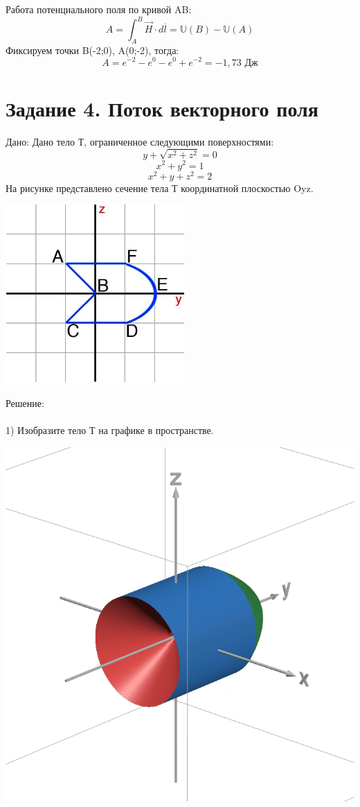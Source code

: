 \documentclass{article}
\begin{document}
Работа потенциального поля по кривой AB:
\begin{equation*}
    A = \int_{A}^{B}\vec{H}\cdot d\overline{l} = \mathbb{U}(B) - \mathbb{U}(A)
\end{equation*}
Фиксируем точки B(-2;0), A(0;-2), тогда:
\begin{equation*}
    A = e^{-2}-e^{0}-e^{0}+e^{-2} = -1,73 \text{ Дж}
\end{equation*}
\section*{Задание 4. Поток векторного поля}
Дано: Дано тело Т, ограниченное следующими поверхностями:
\begin{equation*}
    y+\sqrt{x^2+z^2}=0
\end{equation*}
\begin{equation*}
    x^2+y^2=1
\end{equation*}
\begin{equation*}
    x^2+y+z^2=2
\end{equation*}
На рисунке представлено сечение тела Т координатной плоскостью Oyz.
\begin{center}
    \includegraphics[width=.3\textwidth]{figure.png}
\end{center}
Решение:
\\ \\
1) Изобразите тело Т на графике в пространстве.
\begin{center}
    \includegraphics[width=.5\textwidth]{top.png}
\end{center}
\end{document}

